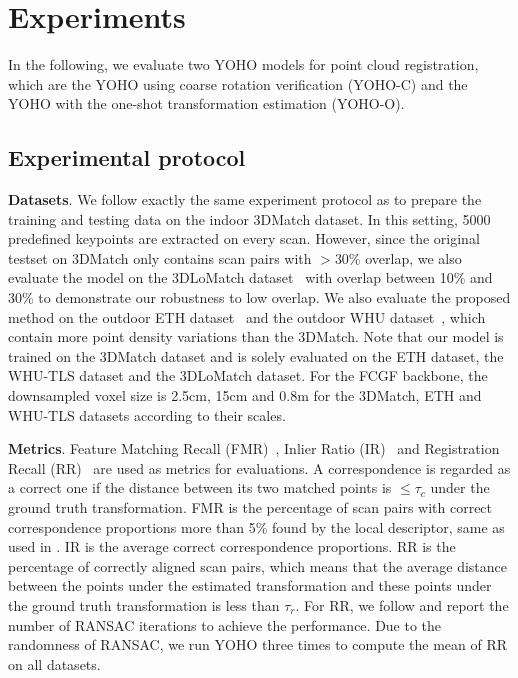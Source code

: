 
\section{Experiments}
In the following, we evaluate two YOHO models for point cloud registration, which are the YOHO using coarse rotation verification (YOHO-C) and the YOHO with the one-shot transformation estimation (YOHO-O).

\subsection{Experimental protocol}

\textbf{Datasets}. We follow exactly the same experiment protocol as \cite{3dmatch} to prepare the training and testing data on the indoor 3DMatch dataset. In this setting, 5000 predefined keypoints are extracted on every scan. 
However, since the original testset on 3DMatch only contains scan pairs with $>$30\% overlap, we also evaluate the model on the 3DLoMatch dataset~\cite{predator} with overlap between 10\% and 30\% to demonstrate our robustness to low overlap. 
We also evaluate the proposed method on the outdoor ETH dataset~\cite{smooth} and the outdoor WHU dataset~\cite{dong2020registration}, which contain more point density variations than the 3DMatch. Note that our model is trained on the 3DMatch dataset and is solely evaluated on the ETH dataset, the WHU-TLS dataset and the 3DLoMatch dataset. 
For the FCGF backbone, the downsampled voxel size is 2.5cm, 15cm and 0.8m for the 3DMatch, ETH and WHU-TLS datasets according to their scales.

\textbf{Metrics}. Feature Matching Recall (FMR)~\cite{smooth,FCGF,predator}, Inlier Ratio (IR)~\cite{predator} and Registration Recall (RR)~\cite{FCGF,d3feat,predator} are used as metrics for evaluations. A correspondence is regarded as a correct one if the distance between its two matched points is $\le \tau_{c}$ under the ground truth transformation. FMR is the percentage of scan pairs with correct correspondence proportions more than 5\% found by the local descriptor, same as used in \cite{ao2020spinnet,predator}. IR is the average correct correspondence proportions. RR is the percentage of correctly aligned scan pairs, which means that the average distance between the points under the estimated transformation and these points under the ground truth transformation is less than $\tau_{r}$. 
For RR, we follow \cite{predator} and report the number of RANSAC iterations to achieve the performance. Due to the randomness of RANSAC, we run YOHO three times to compute the mean of RR on all datasets.

